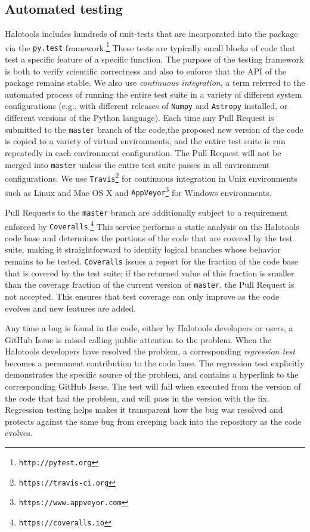 \documentclass[usenatbib,usegraphicx,letterpaper]{mn2e}
\begin{document}
\subsection{Automated testing}
\label{subsection:testing}

Halotools includes hundreds of unit-tests that are incorporated into the package via the {\tt py.test} framework.\footnote{\tt http://pytest.org} These tests are typically small blocks of code that test a specific feature of a specific function. The purpose of the testing framework is both to verify scientific correctness and also to enforce that the API of the package remains stable. We also use {\em continuous integration}, a term referred to the automated process of running the entire test suite in a variety of different system configurations (e.g., with different releases of {\tt Numpy} and {\tt Astropy} installed, or different versions of the Python language). Each time any Pull Request is submitted to the {\tt master} branch of the code,the proposed new version of the code is copied to a variety of virtual environments, and the entire test suite is run repeatedly in each environment configuration. The Pull Request will not be merged into {\tt master} unless the entire test suite passes in all environment configurations. We use {\tt Travis}\footnote{\tt https://travis-ci.org} for continuous integration in Unix environments such as Linux and Mac OS X and {\tt AppVeyor}\footnote{\tt https://www.appveyor.com} for Windows environments. 

Pull Requests to the {\tt master} branch are additionally subject to a requirement enforced by {\tt Coveralls}.\footnote{\tt https://coveralls.io} This service performs a static analysis on the Halotools code base and determines the portions of the code that are covered by the test suite, making it straightforward to identify logical branches whose behavior remains to be tested. {\tt Coveralls} issues a report for the fraction of the code base that is covered by the test suite; if the returned value of this fraction is smaller than the coverage fraction of the current version of {\tt master}, the Pull Request is not accepted. This ensures that test coverage can only improve as the code evolves and new features are added. 

Any time a bug is found in the code, either by Halotools developers or users, a GitHub Issue is raised calling public attention to the problem. When the Halotools developers have resolved the problem, a corresponding {\em regression test} becomes a permanent contribution to the code base. The regression test explicitly demonstrates the specific source of the problem, and contains a hyperlink to the corresponding GitHub Issue. The test will fail when executed from the version of the code that had the problem, and will pass in the version with the fix. Regression testing helps makes it transparent how the bug was resolved and protects against the same bug from creeping back into the repository as the code evolves. 
\end{document}
